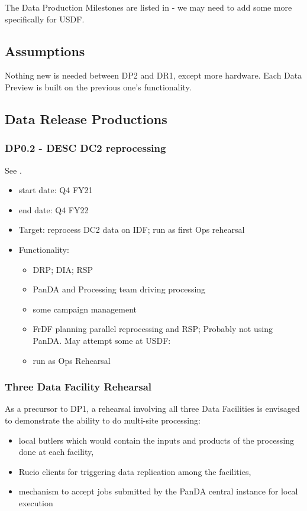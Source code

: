 The Data Production Milestones are listed in  - we may need to add some more specifically for \gls{USDF}.


\subsection{Assumptions}

Nothing new is needed between \gls{DP2} and \gls{DR1}, except more
hardware. Each Data Preview is built on the previous one's functionality.

\subsection{Data \gls{Release} Productions}
\subsubsection{ \gls{DP0}.2 - \gls{DESC} DC2 reprocessing}
See .
\begin{itemize}
\item start date: Q4 \gls{FY21}
\item end date: Q4 \gls{FY22}
\item Target: reprocess \gls{DC2} data on \gls{IDF}; run as first Ops rehearsal
\item Functionality:
\begin{itemize}
\item \gls{DRP}; \gls{DIA}; \gls{RSP}
\item \gls{PanDA} and Processing team driving processing
\item some campaign management
\item \gls{FrDF} planning parallel reprocessing and RSP; Probably not using
  \gls{PanDA}. May attempt some at \gls{USDF}:
\item run as Ops Rehearsal
\end{itemize}
\end{itemize}
\subsubsection{ Three Data Facility Rehearsal}
 As a precursor to DP1, a rehearsal involving all three Data
 Facilities is envisaged to demonstrate the ability to do multi-site
 processing:
 \begin{itemize}
\item local butlers which would contain the inputs and products of the processing done at each facility,
\item Rucio clients for triggering data replication among the facilities,
\item mechanism to accept jobs submitted by the PanDA
central instance for local execution
\end{itemize}
